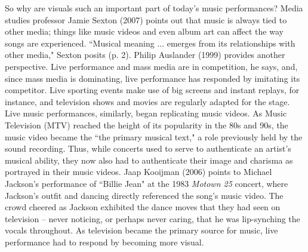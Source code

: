 So why are visuals such an important part of today's music performances? Media studies professor Jamie Sexton (2007) points out that music is always tied to other media; things like music videos and even album art can affect the way songs are experienced. ``Musical meaning ... emerges from its relationships with other media," Sexton posits (p. 2). Philip Auslander (1999) provides another perspective. Live performance and mass media are in competition, he says, and, since mass media is dominating, live performance has responded by imitating its competitor. Live sporting events make use of big screens and instant replays, for instance, and television shows and movies are regularly adapted for the stage. Live music performances, similarly, began replicating music videos. As Music Television (MTV) reached the height of its popularity in the 80s and 90s, the music video became the ``the primary musical text," a role previously held by the sound recording. Thus, while concerts used to serve to authenticate an artist's musical ability, they now also had to authenticate their image and charisma as portrayed in their music videos. Jaap Kooijman (2006) points to Michael Jackson's performance of ``Billie Jean" at the 1983 \textit{Motown 25} concert, where Jackson's outfit and dancing directly referenced the song's music video. The crowd cheered as Jackson exhibited the dance moves that they had seen on television -- never noticing, or perhaps never caring, that he was lip-synching the vocals throughout. As television became the primary source for music, live performance had to respond by becoming more visual. 

